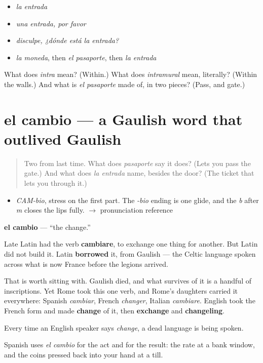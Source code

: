 \begin{itemize}
\raggedright
  \item \emph{la entrada}
  \item \emph{una entrada, por favor}
  \item \emph{disculpe, ¿dónde está la entrada?}
  \item \emph{la moneda}, then \emph{el pasaporte}, then \emph{la entrada}
\end{itemize}

\begin{tcolorbox}[breakable,colback=teal!4,colframe=teal!35!black,title={Before you move on}]
What does \emph{intra} mean? (Within.) What does \emph{intramural} mean, literally? (Within the walls.) And what is \emph{el pasaporte} made of, in two pieces? (Pass, and gate.)
\end{tcolorbox}
\section[el cambio]{el cambio — a Gaulish word that outlived Gaulish}

\label{lesson:ES-C313-cambio}



\begin{quote}
Two from last time. What does \emph{pasaporte} say it does? (Lets you pass the gate.) And what does \emph{la entrada} name, besides the door? (The ticket that lets you through it.)
\end{quote}

\begin{sounds}
\begin{itemize}
\raggedright
  \item \emph{CAM-bio}, stress on the first part. The \emph{-bio} ending is one glide, and the \emph{b} after \emph{m} closes the lips fully. $\to$ pronunciation reference
\end{itemize}
\end{sounds}

\begin{cousinweb}
\textbf{el cambio} — \textquotedblleft{}the change.\textquotedblright{}

Late Latin had the verb \textbf{cambiare}, to exchange one thing for another. But Latin did not build it. Latin \textbf{borrowed} it, from Gaulish — the Celtic language spoken across what is now France before the legions arrived.

That is worth sitting with. Gaulish died, and what survives of it is a handful of inscriptions. Yet Rome took this one verb, and Rome's daughters carried it everywhere: Spanish \emph{cambiar}, French \emph{changer}, Italian \emph{cambiare}. English took the French form and made \textbf{change} of it, then \textbf{exchange} and \textbf{changeling}.

Every time an English speaker says \emph{change}, a dead language is being spoken.

Spanish uses \emph{el cambio} for the act and for the result: the rate at a bank window, and the coins pressed back into your hand at a till.
\end{cousinweb}

